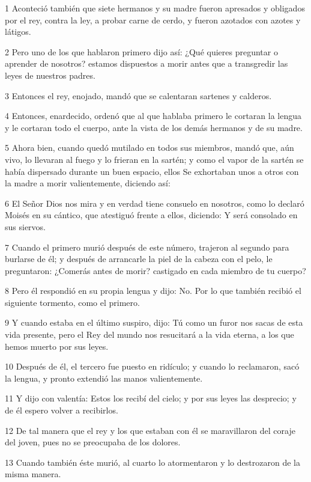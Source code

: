 \par 1 Aconteció también que siete hermanos y su madre fueron apresados ​​y obligados por el rey, contra la ley, a probar carne de cerdo, y fueron azotados con azotes y látigos.
\par 2 Pero uno de los que hablaron primero dijo así: ¿Qué quieres preguntar o aprender de nosotros? estamos dispuestos a morir antes que a transgredir las leyes de nuestros padres.
\par 3 Entonces el rey, enojado, mandó que se calentaran sartenes y calderos.
\par 4 Entonces, enardecido, ordenó que al que hablaba primero le cortaran la lengua y le cortaran todo el cuerpo, ante la vista de los demás hermanos y de su madre.
\par 5 Ahora bien, cuando quedó mutilado en todos sus miembros, mandó que, aún vivo, lo llevaran al fuego y lo frieran en la sartén; y como el vapor de la sartén se había dispersado durante un buen espacio, ellos Se exhortaban unos a otros con la madre a morir valientemente, diciendo así:
\par 6 El Señor Dios nos mira y en verdad tiene consuelo en nosotros, como lo declaró Moisés en su cántico, que atestiguó frente a ellos, diciendo: Y será consolado en sus siervos.
\par 7 Cuando el primero murió después de este número, trajeron al segundo para burlarse de él; y después de arrancarle la piel de la cabeza con el pelo, le preguntaron: ¿Comerás antes de morir? castigado en cada miembro de tu cuerpo?
\par 8 Pero él respondió en su propia lengua y dijo: No. Por lo que también recibió el siguiente tormento, como el primero.
\par 9 Y cuando estaba en el último suspiro, dijo: Tú como un furor nos sacas de esta vida presente, pero el Rey del mundo nos resucitará a la vida eterna, a los que hemos muerto por sus leyes.
\par 10 Después de él, el tercero fue puesto en ridículo; y cuando lo reclamaron, sacó la lengua, y pronto extendió las manos valientemente.
\par 11 Y dijo con valentía: Estos los recibí del cielo; y por sus leyes las desprecio; y de él espero volver a recibirlos.
\par 12 De tal manera que el rey y los que estaban con él se maravillaron del coraje del joven, pues no se preocupaba de los dolores.
\par 13 Cuando también éste murió, al cuarto lo atormentaron y lo destrozaron de la misma manera.
